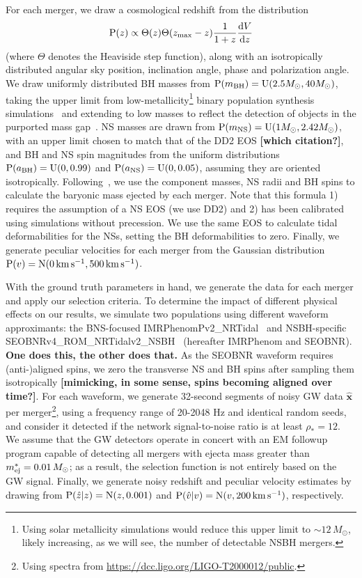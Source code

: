 \documentclass[%
 reprint,
 superscriptaddress,
 nofootinbib,
 amsmath,amssymb,
 aps,
]{revtex4-2}
\newcommand{\msun}{M_\odot}
\newcommand{\vobs}{\ensuremath{\hat{v}}}
\newcommand{\zobs}{\ensuremath{\hat{z}}}
\newcommand{\zmax}{\ensuremath{z_{\rm max}}}
\newcommand{\prob}{\ensuremath{{\rm P}}}
\newcommand{\normal}{{\rm{N}}}
\newcommand{\abh}{a_{\rm BH}}
\newcommand{\ans}{a_{\rm NS}}
\newcommand{\mbh}{m_{\rm BH}}
\newcommand{\mns}{m_{\rm NS}}
\newcommand{\uniform}{{\rm U}}
\newcommand{\step}{\Theta}
\newcommand{\snrmin}{\rho_*}
\newcommand{\mejmin}{m_{\rm ej}^*}
\newcommand{\dgw}{\hat{\bm{x}}}
\newcommand{\kms}{\ensuremath{{\rm km\,s^{-1}}}}
\begin{document}
For each merger, we draw a cosmological redshift from the distribution
\begin{equation}
\prob(z) \propto \step(z) \step(\zmax-z) \frac{1}{1+z} \frac{{\rm d}V}{{\rm d}z}
\end{equation}
(where $\step$ denotes the Heaviside step function), along with an isotropically distributed angular sky position, inclination angle, phase and polarization angle. We draw uniformly distributed BH masses from $\prob(\mbh) = \uniform(2.5\msun, 40\msun)$, taking the upper limit from low-metallicity\footnote{Using solar metallicity simulations would reduce this upper limit to $\sim12\,\msun$, likely increasing, as we will see, the number of detectable NSBH mergers.}
binary population synthesis simulations~\citep{Kruckow_etal:2018} and extending to low masses to reflect the detection of objects in the purported mass gap~\citep{LVC:2020O3acat}. NS masses are drawn from $\prob(\mns) = \uniform(1\msun, 2.42\msun)$, with an upper limit chosen to match that of the DD2 EOS {\bf [which citation?]}, and BH and NS spin magnitudes from the uniform distributions $\prob(\abh) = \uniform(0, 0.99)$ and  $\prob(\ans) = \uniform(0, 0.05)$, assuming they are oriented isotropically. Following~\cite{Foucart_etal:2018}, we use the component masses, NS radii and BH spins to calculate the baryonic mass ejected by each merger. Note that this formula 1) requires the assumption of a NS EOS (we use DD2) and 2) has been calibrated using simulations without precession. We use the same EOS to calculate tidal deformabilities for the NSs, setting the BH deformabilities to zero. Finally, we generate peculiar velocities for each merger from the Gaussian distribution $\prob(v) = \normal(0\,\kms,500\,\kms)$.

With the ground truth parameters in hand, we generate the data for each merger and apply our selection criteria.  To determine the impact of different physical effects on our results, we simulate two populations using different waveform approximants: the BNS-focused IMRPhenomPv2\_NRTidal~\citep{Dietrich_etal:2019} and NSBH-specific SEOBNRv4\_ROM\_NRTidalv2\_NSBH~\citep{Matas_etal:2020} (hereafter IMRPhenom and SEOBNR). {\bf One does this, the other does that.} As the SEOBNR waveform requires (anti-)aligned spins, we zero the transverse NS and BH spins after sampling them isotropically {\bf [mimicking, in some sense, spins becoming aligned over time?]}. For each waveform, we generate 32-second segments of noisy GW data $\dgw$ per merger\footnote{Using spectra from \url{https://dcc.ligo.org/LIGO-T2000012/public}.}, using a frequency range of 20-2048 Hz and identical random seeds, and consider it detected if the network signal-to-noise ratio is at least $\snrmin = 12$. We assume that the GW detectors operate in concert with an EM followup program capable of detecting all mergers with ejecta mass greater than $\mejmin = 0.01\,M_\odot$; as a result, the selection function is not entirely based on the GW signal. Finally, we generate noisy redshift and peculiar velocity estimates by drawing from $\prob(\zobs|z)=\normal(z,0.001)$ and $\prob(\vobs|v)=\normal(v,200\,\kms)$, respectively.
\end{document}
